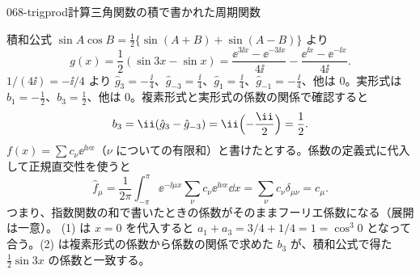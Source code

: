 \documentclass[uplatex,dvipdfmx,a4paper,11pt]{jsarticle}
\begin{document}
\begin{mondai}{068-trigprod}{計算}{三角関数の積で書かれた周期関数}
\begin{tadashii}
 積和公式 $\sin A\cos B=\frac{1}{2}\{\sin(A+B)+\sin(A-B)\}$ より
\[
g(x)=\frac{1}{2}(\sin3x-\sin x)=\frac{\ee^{3\ii x}-\ee^{-3\ii x}}{4\ii}-\frac{\ee^{\ii x}-\ee^{-\ii x}}{4\ii}.
\]
$1/(4\ii)=-\ii/4$ より $\hat{g}_{3}=-\frac{\ii}{4}$、$\hat{g}_{-3}=\frac{\ii}{4}$、$\hat{g}_{1}=\frac{\ii}{4}$、$\hat{g}_{-1}=-\frac{\ii}{4}$、他は $0$。実形式は $b_1=-\frac{1}{2}$、$b_3=\frac{1}{2}$、他は $0$。複素形式と実形式の係数の関係で確認すると
\[
b_3=\ii(\hat{g}_3-\hat{g}_{-3})=\ii\Bigl(-\frac{\ii}{2}\Bigr)=\frac{1}{2}.
\]
 $f(x)=\sum c_{\nu}\ee^{\ii\nu x}$（$\nu$ についての有限和）と書けたとする。係数の定義式に代入して正規直交性を使うと
\[
\hat{f}_{\mu}=\frac{1}{2\pi}\int_{-\pi}^{\pi}\ee^{-\ii\mu x}\sum_{\nu}c_{\nu}\ee^{\ii\nu x}\dd x=\sum_{\nu}c_{\nu}\delta_{\mu\nu}=c_{\mu}.
\]
つまり、指数関数の和で書いたときの係数がそのままフーリエ係数になる（展開は一意）。
\kenzan (1) は $x=0$ を代入すると $a_1+a_3=3/4+1/4=1=\cos^{3}0$ となって合う。(2) は複素形式の係数から係数の関係で求めた $b_3$ が、積和公式で得た $\frac{1}{2}\sin3x$ の係数と一致する。
\end{tadashii}
\end{mondai}
\end{document}
